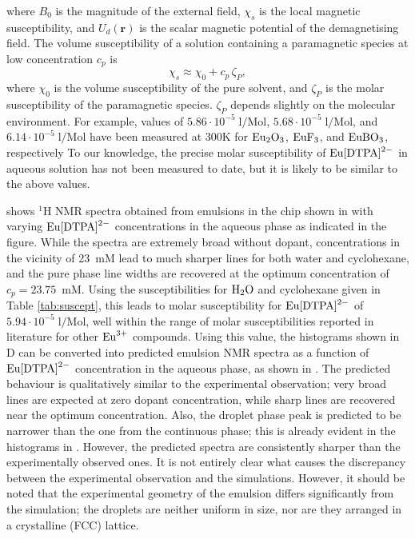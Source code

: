 where $B_0$ is the magnitude of the external field, $\chi_s$ is the local
magnetic susceptibility, and $U_d(\mathbf{r})$ is the scalar magnetic potential
of the demagnetising field. The volume susceptibility of a solution containing a
paramagnetic species at low concentration $c_p$ is
\begin{equation}
    \chi_s \approx \chi_0 + c_p\,\zeta_P,
\end{equation}
where $\chi_0$ is the volume susceptibility of the pure solvent,
and $\zeta_P$ is the
molar susceptibility of the paramagnetic species. $\zeta_P$ depends
slightly on the molecular environment. For example, values of
$5.86\cdot 10^{-5}\;\mathrm{l/\text{Mol}}$,
$5.68\cdot 10^{-5}\;\mathrm{l/\text{Mol}}$, and
$6.14\cdot 10^{-5}\;\mathrm{l/\text{Mol}}$ have been measured at 300K for
$\ce{Eu_2O_3}$, $\ce{EuF_3}$, and $\ce{EuBO_3}$, respectively\citep{Takikawa:2010iw}
To our knowledge, the precise molar susceptibility of $\ce{Eu[DTPA]^{2-}}$ in
aqueous solution has not been measured to date, but it is likely to be
similar to the above values.

 shows $^1$H NMR spectra obtained from emulsions in the chip
shown in  with varying $\ce{Eu[DTPA]^{2-}}$ concentrations in the aqueous
phase as indicated in the figure. While the spectra are extremely broad without dopant,
concentrations in the vicinity of 23~mM lead to much sharper lines for both water and cyclohexane,
and the pure phase line widths are recovered at the optimum concentration of $c_p=23.75$~mM.
Using the susceptibilities for $\ce{H2O}$ and cyclohexane given in
Table \ref{tab:suscept}, this leads to molar susceptibility for $\ce{Eu[DTPA]^{2-}}$
of $5.94\cdot 10^{-5}\;\mathrm{l/\text{Mol}}$, well within the range
 of molar susceptibilities reported in literature for other $\ce{Eu^{3+}}$
 compounds. Using this value, the histograms
shown in D can be converted into
predicted emulsion NMR spectra as a function of $\ce{Eu[DTPA]^{2-}}$
concentration in the aqueous phase,
as shown in .
The predicted behaviour is qualitatively similar to the experimental observation; very broad
lines are expected at zero dopant concentration, while sharp lines are recovered near the optimum
concentration. Also, the droplet phase peak is predicted to be narrower than the one from the continuous phase; this is already evident
in the histograms in .  However, the predicted spectra are consistently sharper than the experimentally
observed ones.
It is not entirely clear what causes the discrepancy between the experimental observation
and the simulations. However, it should be noted that the experimental geometry of the emulsion
differs significantly from the simulation; the droplets are neither uniform in size, nor are they
arranged in a crystalline (FCC) lattice.


